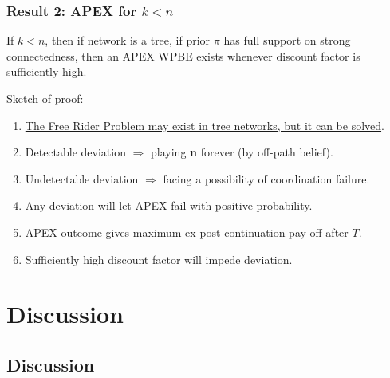 \documentclass[8pt]{beamer}
\begin{document}
\begin{frame}
\frametitle{Result 2: APEX for $k<n$}
\begin{theorem}[\alert{$k< n$}]
If $k<n$, then if network is a \alert{tree}, if prior $\pi$ has \alert{full support on strong connectedness}, then an APEX WPBE {exists} whenever discount factor is sufficiently high.
\end{theorem}

Sketch of proof:
\begin{enumerate}
\item \underline{The Free Rider Problem may exist in tree networks, but it can be solved}.
\item Detectable deviation $\Rightarrow$ playing \textbf{n} forever (by off-path belief).
\item Undetectable deviation $\Rightarrow$ facing a possibility of coordination failure.
\item Any deviation will let APEX fail with positive probability.
\item APEX outcome gives maximum ex-post continuation pay-off after $T$.
\item Sufficiently high discount factor will impede deviation.
\end{enumerate}



\end{frame}


\section{Discussion}
\subsection{Discussion}
\end{document}
